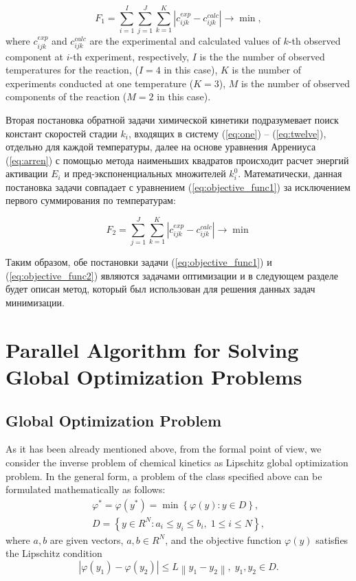 \documentclass{svproc}
\begin{document}
\begin{equation}
  F_1 = \sum_{i=1}^I \sum_{j=1}^J \sum_{k=1}^K \left| c_{ijk}^{exp} - c_{ijk}^{calc} \right| \longrightarrow \min,
  \label{eq:objective_func1}
\end{equation}
where $c_{ijk}^{exp}$ and $c_{ijk}^{calc}$ are the experimental and calculated values
of $k$-th observed component at $i$-th experiment, respectively, $I$ is the the number of observed temperatures for the reaction, ($I = 4$ in this case), $K$ is the number of experiments conducted at one temperature ($K = 3$), $M$ is the number of observed components of the reaction ($M = 2$ in this case).

Вторая постановка обратной задачи химической кинетики подразумевает поиск констант скоростей стадии $k_i$, входящих в систему (\ref{eq:one}) -- (\ref{eq:twelve}), отдельно для каждой температуры, далее на основе уравнения Аррениуса (\ref{eq:arren}) с помощью метода наименьших квадратов происходит расчет энергий активации $E_i$ и пред-экспоненциальных множителей $k_i^0$. Математически, данная постановка задачи совпадает с уравнением (\ref{eq:objective_func1}) за исключением первого суммирования по температурам:

\begin{equation}
  F_2 = \sum_{j=1}^J \sum_{k=1}^K \left| c_{ijk}^{exp} - c_{ijk}^{calc} \right| \longrightarrow \min
  \label{eq:objective_func2} 
\end{equation}

Таким образом, обе постановки задачи (\ref{eq:objective_func1}) и (\ref{eq:objective_func2}) являются задачами оптимизации и в следующем разделе будет описан метод, который был использован для решения данных задач минимизации.

\section{Parallel Algorithm for Solving Global Optimization Problems }\label{Sec_GSA}

\subsection{Global Optimization Problem}

As it has been already mentioned above, from the formal point of view, we consider the inverse problem of chemical kinetics as Lipschitz global optimization problem. In the general form, a problem of the class specified above can be formulated mathematically as 
follows:
\begin{gather}
 \varphi^* = \varphi(y^\ast)=\min{\left\{\varphi(y):y\in D\right\}}, \label{problemN}\\
 D=\left\{y\in R^N: a_i\leq y_i \leq b_i, \;  1\leq i \leq N\right\} \label{D},
\end{gather}
where $a,b$ are given vectors, $a,b\in R^N$, and the objective function $\varphi(y)$ satisfies the Lipschitz condition
\begin{equation}\label{Lip}
\left|\varphi(y_1)-\varphi(y_2)\right|\leq L\left\|y_1-y_2\right\|,\; y_1,y_2 \in D.
\end{equation}
\end{document}

